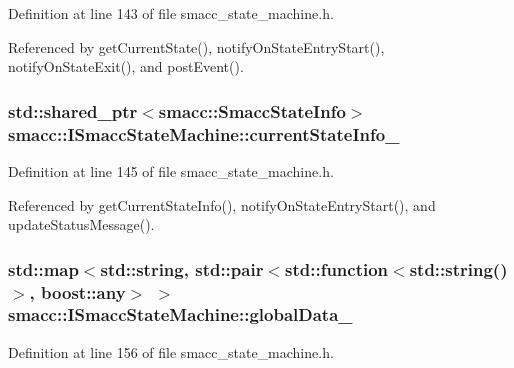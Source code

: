 Definition at line 143 of file smacc\+\_\+state\+\_\+machine.\+h.



Referenced by get\+Current\+State(), notify\+On\+State\+Entry\+Start(), notify\+On\+State\+Exit(), and post\+Event().

\subsubsection[{\texorpdfstring{current\+State\+Info\+\_\+}{currentStateInfo_}}]{\setlength{\rightskip}{0pt plus 5cm}std\+::shared\+\_\+ptr$<${\bf smacc\+::\+Smacc\+State\+Info}$>$ smacc\+::\+I\+Smacc\+State\+Machine\+::current\+State\+Info\+\_\+\hspace{0.3cm}{\ttfamily [protected]}}\hypertarget{classsmacc_1_1ISmaccStateMachine_ac8ac420db18ed72cc0c7535f16c0aae8}{}\label{classsmacc_1_1ISmaccStateMachine_ac8ac420db18ed72cc0c7535f16c0aae8}


Definition at line 145 of file smacc\+\_\+state\+\_\+machine.\+h.



Referenced by get\+Current\+State\+Info(), notify\+On\+State\+Entry\+Start(), and update\+Status\+Message().

\subsubsection[{\texorpdfstring{global\+Data\+\_\+}{globalData_}}]{\setlength{\rightskip}{0pt plus 5cm}std\+::map$<$std\+::string, std\+::pair$<$std\+::function$<$std\+::string()$>$, boost\+::any$>$ $>$ smacc\+::\+I\+Smacc\+State\+Machine\+::global\+Data\+\_\+\hspace{0.3cm}{\ttfamily [private]}}\hypertarget{classsmacc_1_1ISmaccStateMachine_ad2f9dae184ea942db632ac4532a10a91}{}\label{classsmacc_1_1ISmaccStateMachine_ad2f9dae184ea942db632ac4532a10a91}


Definition at line 156 of file smacc\+\_\+state\+\_\+machine.\+h.



